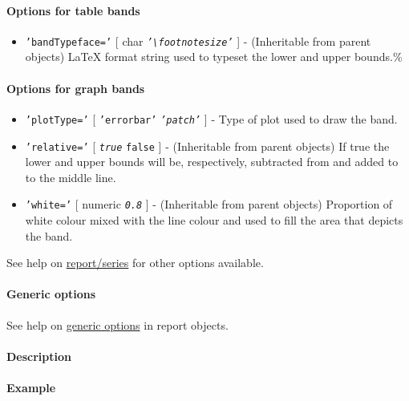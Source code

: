  \paragraph{Options for table bands}
 
 \begin{itemize}
 \item
   \texttt{'bandTypeface='} {[} char \textbar{}
   \emph{\texttt{'\textbackslash{}footnotesize'}} {]} - (Inheritable from
   parent objects) LaTeX format string used to typeset the lower and
   upper bounds.\%
 \end{itemize}
 
 \paragraph{Options for graph bands}
 
 \begin{itemize}
 \item
   \texttt{'plotType='} {[} \texttt{'errorbar'} \textbar{}
   \emph{\texttt{'patch'}} {]} - Type of plot used to draw the band.
 \item
   \texttt{'relative='} {[} \emph{\texttt{true}} \textbar{}
   \texttt{false} {]} - (Inheritable from parent objects) If true the
   lower and upper bounds will be, respectively, subtracted from and
   added to to the middle line.
 \item
   \texttt{'white='} {[} numeric \textbar{} \emph{\texttt{0.8}} {]} -
   (Inheritable from parent objects) Proportion of white colour mixed
   with the line colour and used to fill the area that depicts the band.
 \end{itemize}
 
 See help on \url{report/series} for other options available.
 
 \paragraph{Generic options}
 
 See help on \href{report/Contents}{generic options} in report objects.
 
 \paragraph{Description}
 
 \paragraph{Example}


